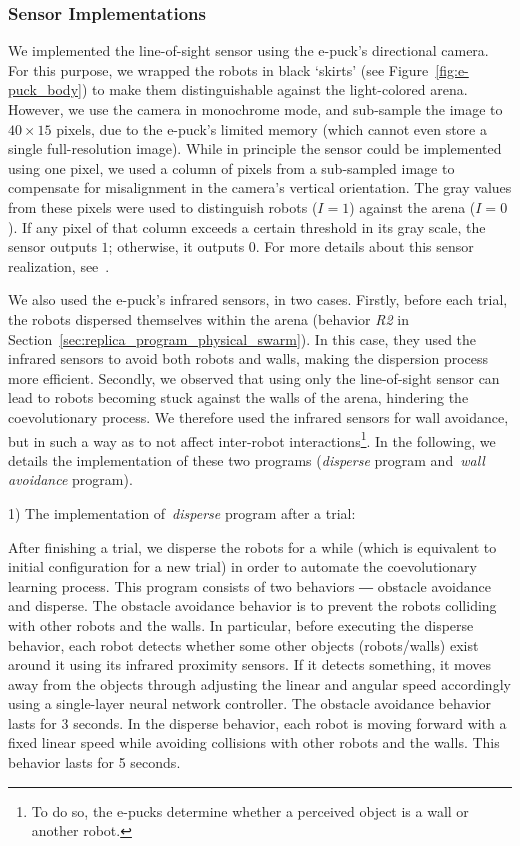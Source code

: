 \subsubsection{Sensor Implementations}

We implemented the line-of-sight sensor using the e-puck's directional camera. For this purpose, we wrapped the robots in black `skirts' (see Figure~\ref{fig:e-puck_body}) to make them distinguishable against the light-colored arena.  However, we use the camera in monochrome mode, and sub-sample the image to $40 \times 15$ pixels, due to the e-puck's limited memory (which cannot even store a single full-resolution image). While in principle the sensor could be implemented using one pixel, we used a column of pixels from a sub-sampled image to compensate for misalignment in the camera's vertical orientation. The gray values from these pixels were used to distinguish robots ($I=1$) against the arena ($I=0$). If any pixel of that column exceeds a certain threshold in its gray scale, the sensor outputs $1$; otherwise, it outputs $0$. For more details about this sensor realization, see~\cite{Gauci2014_ijrr}.

We also used the e-puck's infrared sensors, in two cases. Firstly, before each trial, the robots dispersed themselves within the arena (behavior \textit{R2} in Section~\ref{sec:replica_program_physical_swarm}). In this case, they used the infrared sensors to avoid both robots and walls, making the dispersion process more efficient. Secondly, we observed that using only the line-of-sight sensor can lead to robots becoming stuck against the walls of the arena, hindering the coevolutionary process. We therefore used the infrared sensors for wall avoidance, but in such a way as to not affect inter-robot interactions\footnote{To do so, the e-pucks determine whether a perceived object is a wall or another robot.}. In the following, we details the implementation of these two programs (\textit{disperse} program and~\textit{wall avoidance} program). 

1) The implementation of~\textit{disperse} program after a trial:

After finishing a trial, we disperse the robots for a while (which is equivalent to initial configuration for a new trial) in order to automate the coevolutionary learning process. This program consists of two behaviors ― obstacle avoidance and disperse. The obstacle avoidance behavior is to prevent the robots colliding with other robots and the walls. In particular, before executing the disperse behavior, each robot detects whether some other objects (robots/walls) exist around it using its infrared proximity sensors. If it detects something, it moves away from the objects through adjusting the linear and angular speed accordingly using a single-layer neural network controller. The obstacle avoidance behavior lasts for 3 seconds. In the disperse behavior, each robot is moving forward with a fixed linear speed while avoiding collisions with other robots and the walls. This behavior lasts for 5 seconds.

